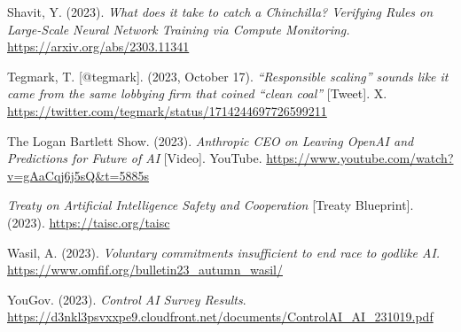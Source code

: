 \documentclass[12pt,a4paper]{article}
\begin{document}
Shavit, Y. (2023). \textit{What does it take to catch a Chinchilla? Verifying Rules on Large-Scale Neural Network Training via Compute Monitoring. }\url{https://arxiv.org/abs/2303.11341}

Tegmark, T. [@tegmark]. (2023, October 17). \textit{“Responsible scaling” sounds like it came from the same lobbying firm that coined “clean coal”} [Tweet]. X. \url{https://twitter.com/tegmark/status/1714244697726599211}

The Logan Bartlett Show. (2023). \textit{Anthropic CEO on Leaving OpenAI and Predictions for Future of AI} [Video]. YouTube. \url{https://www.youtube.com/watch?v=gAaCqj6j5sQ&t=5885s}

\textit{Treaty on Artificial Intelligence Safety and Cooperation} [Treaty Blueprint]. (2023). \url{https://taisc.org/taisc}

Wasil, A. (2023). \textit{Voluntary commitments insufficient to end race to godlike AI.} \url{https://www.omfif.org/bulletin23_autumn_wasil/}

YouGov. (2023). \textit{Control AI Survey Results}. \url{ https://d3nkl3psvxxpe9.cloudfront.net/documents/ControlAI_AI_231019.pdf}
\end{document}
